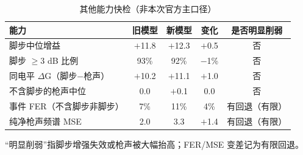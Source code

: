 \begin{table}[htbp]\centering
\caption{其他能力快检（非本次官方主口径）}\label{tab:nm_other}
{\small\begin{threeparttable}
\begin{tabularx}{\linewidth}{Lcccc}\toprule
能力 & 旧模型 & 新模型 & 变化 & 是否明显削弱 \\
\midrule
脚步中位增益 & $+$11.8 & $+$12.3 & $+$0.5 & 否 \\
脚步 $\geq$3 dB 比例 & 93\% & 92\% & $-$1\% & 否 \\
同电平 $\Delta$G（脚步$-$枪声） & $+$10.2 & $+$11.1 & $+$1.0 & 否 \\
不含脚步的枪声中位 & 0.0 & $+$0.1 & 0.0 & 否 \\
事件 FER（不含脚步非脚步） & 7\% & 11\% & 4\% & 有回退（有限） \\
纯净枪声频谱 MSE & 2.0 & 3.3 & $+$1.4 & 有回退（有限） \\
\bottomrule\end{tabularx}
\begin{tablenotes}\footnotesize\item “明显削弱”指脚步增强失效或枪声被大幅抬高；FER/MSE 变差记为有限回退。\end{tablenotes}\end{threeparttable}}
\end{table}
